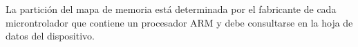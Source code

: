 \documentclass[10pt,a4paper,twoside,spanish]{article}	%
\begin{document}
La partición del mapa de memoria está determinada por el fabricante de cada microntrolador que contiene un procesador ARM y debe consultarse en la hoja de datos del dispositivo.


\end{document}
